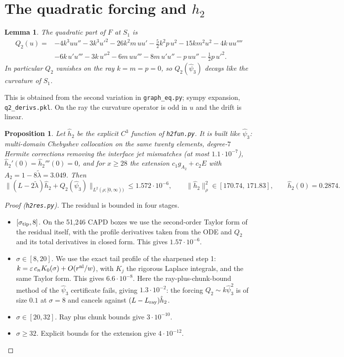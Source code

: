 \documentclass[11pt]{amsart}
\newtheorem{proposition}[theorem]{Proposition}
\newtheorem{lemma}[theorem]{Lemma}
\theoremstyle{remark}
\newcommand{\eps}{\varepsilon}
\newcommand{\lt}{\tilde\lambda}
\begin{document}
\section{The quadratic forcing and $h_2$}
\begin{lemma}
The quadratic part of $F$ at $S_1$ is
\begin{align*}
Q_2(u)={}&-4k^3uu''-3k^3u'^2-26k^2m\,uu'-\tfrac52k^2p\,u^2-15km^2u^2-4k\,uu''''\\
&-6k\,u'u'''-3k\,u''^2-6m\,uu'''-8m\,u'u''-p\,uu''-\tfrac12p\,u'^2 .
\end{align*}
In particular $Q_2$ vanishes on the ray $k=m=p=0$, so $Q_2(\hat\psi_3)$ decays like the curvature of $S_1$.
\end{lemma}
This is obtained from the second variation in \texttt{graph\_eq.py}; sympy expansion, \texttt{q2\_derivs.pkl}. On the ray the curvature operator is odd in $u$ and the drift is linear.

\begin{proposition}\label{prop:h2}
Let $\hat h_2$ be the explicit $C^3$ function of \texttt{h2fun.py}. It is built like $\hat\psi_3$: multi-domain Chebyshev collocation on the same twenty elements, degree-$7$ Hermite corrections removing the interface jet mismatches (at most $1.1\cdot10^{-7}$), $\hat h_2'(0)=\hat h_2'''(0)=0$, and for $x\ge28$ the extension $c_1g_{A_2}+c_2E$ with $A_2=1-8\lt=3.049$. Then
\[
\big\|(L-2\lt)\hat h_2+Q_2(\hat\psi_3)\big\|_{L^2(\rho;[0,\infty))}\le1.572\cdot10^{-6},\qquad \|\hat h_2\|_\rho^2\in[170.74,\,171.83],\qquad \hat h_2(0)=0.2874.
\]
\end{proposition}
\begin{proof}[Proof (\texttt{h2res.py})]
The residual is bounded in four stages.
\begin{itemize}
\item \emph{$[\sigma_{\rm tip},8]$.} On the 51{,}246 CAPD boxes we use the second-order Taylor form of the residual itself, with the profile derivatives taken from the ODE and $Q_2$ and its total derivatives in closed form. This gives $1.57\cdot10^{-6}$.
\item \emph{$\sigma\in[8,20]$.} We use the exact tail profile of the sharpened step 1: $k=\eps\,c_nK_0(\sigma)+O(r^{\rm nl}/w)$, with $K_j$ the rigorous Laplace integrals, and the same Taylor form. This gives $6.6\cdot10^{-8}$. Here the ray-plus-chunk-bound method of the $\hat\psi_3$ certificate fails, giving $1.3\cdot10^{-2}$: the forcing $Q_2\sim k\hat\psi_3^2$ is of size $0.1$ at $\sigma=8$ and cancels against $(L-L_{\rm ray})\hat h_2$.
\item \emph{$\sigma\in[20,32]$.} Ray plus chunk bounds give $3\cdot10^{-10}$.
\item \emph{$\sigma\ge32$.} Explicit bounds for the extension give $4\cdot10^{-12}$.
\end{itemize}
\end{proof}
\end{document}
